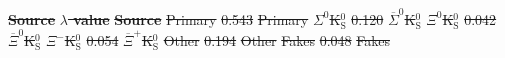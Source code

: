 \documentclass[ALICE,manyauthors]{cernphprep}
\newcommand{\LamK}{$\Lambda$K\xspace}
\newcommand{\LamKs}{$\Lambda\mathrm{K^{0}_{S}}$\xspace}
\newcommand{\ALamKs}{$\overline{\Lambda}\mathrm{K^{0}_{S}}$\xspace}
\providecommand{\DIFdeltex}[1]{{\protect\color{red}\sout{#1}}}                      %
\providecommand{\DIFdelFL}[1]{\DIFdel{#1}} %
\providecommand{\DIFdel}[1]{\texorpdfstring{\DIFdeltex{#1}}{}} %
\begin{document}

\textbf{\DIFdelFL{Source}} %
\textbf{\DIFdelFL{$\lambda$ value}} %
\textbf{\DIFdelFL{Source}} %
\DIFdelFL{Primary }%
\DIFdelFL{0.543 }%
\DIFdelFL{Primary }%
\DIFdelFL{$\Sigma^{0}$K$^{0}_{\mathrm{S}}$ }%
\DIFdelFL{0.120 }%
\DIFdelFL{$\overline{\Sigma}^{0}$K$^{0}_{\mathrm{S}}$ }%
\DIFdelFL{$\Xi^{0}$K$^{0}_{\mathrm{S}}$ }%
\DIFdelFL{0.042 }%
\DIFdelFL{$\overline{\Xi}^{0}$K$^{0}_{\mathrm{S}}$ }%
\DIFdelFL{$\Xi^{-}$K$^{0}_{\mathrm{S}}$ }%
\DIFdelFL{0.054 }%
\DIFdelFL{$\overline{\Xi}^{+}$K$^{0}_{\mathrm{S}}$ }%
\DIFdelFL{Other }%
\DIFdelFL{0.194 }%
\DIFdelFL{Other }%
\DIFdelFL{Fakes }%
\DIFdelFL{0.048 }%
\DIFdelFL{Fakes }%
\end{document}
